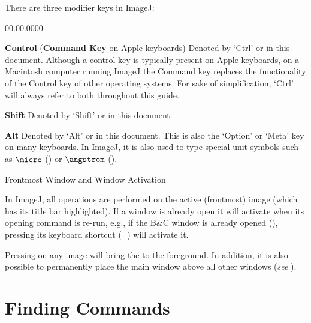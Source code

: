 There are three modifier keys in ImageJ:
\begin{lyxlist}{00.00.0000}
\item [{\textbf{Control}}] (\textbf{Command Key} on
Apple keyboards) Denoted by `Ctrl'
or  in this document. Although a control key is
typically present on Apple keyboards, on a Macintosh computer running
ImageJ the Command key  replaces the functionality
of the Control key of other operating systems. For sake of simplification,
`Ctrl' will always refer to both  throughout this guide.
\item [{\textbf{Shift}}] Denoted by `Shift'
or  in this document.
\item [{\textbf{Alt}}] Denoted by `Alt'
or  in this document. This is also the `Option'
or `Meta' key on many keyboards. In ImageJ, it is also used to type
special unit symbols such as $\micro$ ()
or $\angstrom$ (). 
\end{lyxlist}


\begin{infobox}
\caption{\label{infobox:Frontmost-window}Frontmost Window and Window Activation}


\noindent In ImageJ, all operations are performed on the active (frontmost)
image (which has its title bar highlighted). If a window is already
open it will activate when its opening command is re-run, e.g., if
the B\&C window is already opened (),
pressing its keyboard shortcut (\,
\,) will activate it. \medskip{}


\noindent Pressing  on any image will
bring the  to the foreground. In addition,
it is also possible to permanently place the main window above all
other windows (\emph{see}  ).
\end{infobox}



\section{Finding Commands\label{sec:Finding-Commands}}

